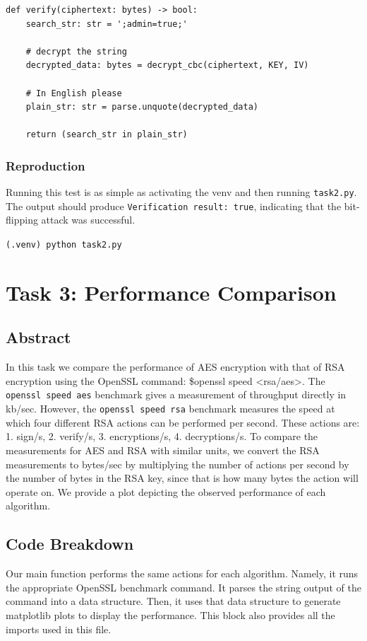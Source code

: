 \documentclass[11pt]{article}
\begin{document}
\begin{framed}
\begin{verbatim}
def verify(ciphertext: bytes) -> bool:
    search_str: str = ';admin=true;'

    # decrypt the string  
    decrypted_data: bytes = decrypt_cbc(ciphertext, KEY, IV)

    # In English please
    plain_str: str = parse.unquote(decrypted_data)

    return (search_str in plain_str)

\end{verbatim}
\end{framed}

\subsubsection*{Reproduction}

Running this test is as simple as activating the venv and then running \verb|task2.py|. The output should produce \verb|Verification result: true|, indicating that the bit-flipping attack was successful.

\verb|(.venv) python task2.py|

\section*{Task 3: Performance Comparison}
\subsection*{Abstract}

In this task we compare the performance of AES encryption with that of RSA encryption using the OpenSSL command: \$openssl speed <rsa/aes>. The \verb|openssl speed aes| benchmark gives a measurement of throughput directly in kb/sec. However, the \verb|openssl speed rsa| benchmark measures the speed at which four different RSA actions can be performed per second. These actions are: 1. sign/s, 2. verify/s, 3. encryptions/s, 4. decryptions/s. To compare the measurements for AES and RSA with similar units, we convert the RSA measurements to bytes/sec by multiplying the number of actions per second by the number of bytes in the RSA key, since that is how many bytes the action will operate on. We provide a plot depicting the observed performance of each algorithm.

\subsection*{Code Breakdown}
Our main function performs the same actions for each algorithm. Namely, it runs the appropriate OpenSSL benchmark command. It parses the string output of the command into a data structure. Then, it uses that data structure to generate matplotlib plots to display the performance. This block also provides all the imports used in this file.
\end{document}
